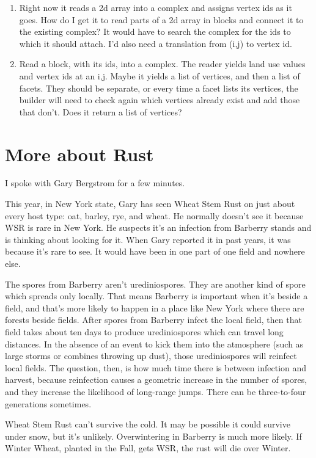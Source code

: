 \documentclass{article}
\begin{document}
\begin{enumerate}
	\item Right now it reads a 2d array into a complex and assigns vertex ids as it goes. How do I get it to read parts of a 2d array in blocks and connect it to the existing complex? It would have to search the complex for the ids to which it should attach. I'd also need a translation from (i,j) to vertex id.
	
	\item Read a block, with its ids, into a complex. The reader yields land use values and vertex ids at an i,j. Maybe it yields a list of vertices, and then a list of facets. They should be separate, or every time a facet lists its vertices, the builder will need to check again which vertices already exist and add those that don't. Does it return a list of vertices?
\end{enumerate}

\section{More about Rust}

I spoke with Gary Bergstrom for a few minutes.

This year, in New York state, Gary has seen Wheat Stem Rust on just about every host type: oat, barley, rye, and wheat. He normally doesn't see it because WSR is rare in New York. He suspects it's an infection from Barberry stands and is thinking about looking for it. When Gary reported it in past years, it was because it's rare to see. It would have been in one part of one field and nowhere else.

The spores from Barberry aren't urediniospores. They are another kind of spore which spreads only locally. That means Barberry is important when it's beside a field, and that's more likely to happen in a place like New York where there are forests beside fields. After spores from Barberry infect the local field, then that field takes about ten days to produce urediniospores which can travel long distances. In the absence of an event to kick them into the atmosphere (such as large storms or combines throwing up dust), those urediniospores will reinfect local fields. The question, then, is how much time there is between infection and harvest, because reinfection causes a geometric increase in the number of spores, and they increase the likelihood of long-range jumps. There can be three-to-four generations sometimes.

Wheat Stem Rust can't survive the cold. It may be possible it could survive under snow, but it's unlikely. Overwintering in Barberry is much more likely. If Winter Wheat, planted in the Fall, gets WSR, the rust will die over Winter.
\end{document}
